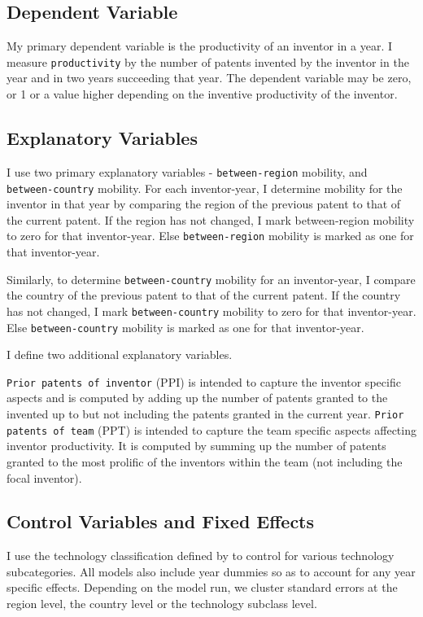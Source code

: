 \documentclass[12pt]{article}
\begin{document}
\subsection{Dependent Variable}
My primary dependent variable is the productivity of an inventor in a year.  I measure \texttt{productivity} by the number of patents invented by the inventor in the year and in two years succeeding that year. The dependent variable may be zero, or 1 or a value higher depending on the inventive productivity of the inventor.

\subsection{Explanatory Variables}
I use two primary explanatory variables - \texttt{between-region} mobility, and \texttt{between-country} mobility.  For each inventor-year,  I  determine mobility for the inventor in that year by comparing the region  of the previous patent to that of the current patent. If the region has not changed, I mark between-region mobility to zero for that inventor-year. Else \texttt{between-region} mobility is marked as one for that inventor-year.\par

Similarly, to determine \texttt{between-country} mobility for an inventor-year,  I  compare the country  of the previous patent to that of the current patent. If the country has not changed, I mark \texttt{between-country} mobility to zero for that inventor-year. Else \texttt{between-country} mobility is marked as one for that inventor-year.\par

I define two additional explanatory variables. \par
\texttt{Prior patents of inventor} (PPI) is intended to capture the inventor specific aspects and is computed by adding up the number of patents granted to the invented up to but not including the patents granted in the current year. \texttt{Prior patents of team} (PPT) is intended to capture the team specific aspects affecting inventor productivity. It is computed by summing up the number of patents granted to the most prolific of the inventors within the team (not including the focal inventor).

\subsection{Control Variables and Fixed Effects}
I use the technology classification defined by  \cite{Hall2001} to control for various technology subcategories. All models also include  year dummies so as to account for any year specific effects. Depending on the model run, we cluster standard errors at the region level, the country level or the technology subclass level.
\end{document}
